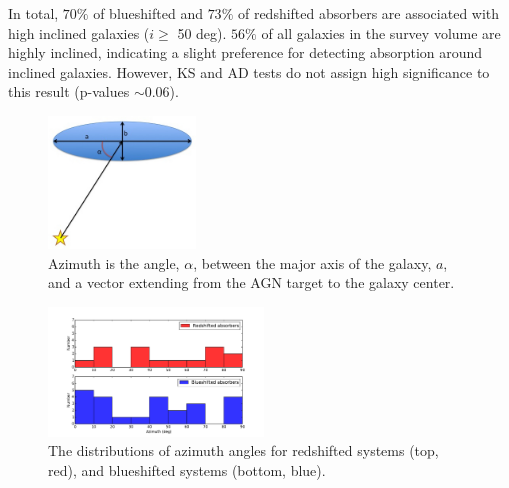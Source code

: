 \documentclass[iop]{emulateapj-rtx4}
\begin{document}
In total, $70\%$ of blueshifted and $73\%$ of redshifted absorbers are associated with high inclined galaxies ($i \geq$ 50 deg). $56\%$ of all galaxies in the survey volume are highly inclined, indicating a slight preference for detecting absorption around inclined galaxies. However, KS and AD tests do not assign high significance to this result (p-values $\sim0.06$).

\begin{figure}[h!]
        \centering
        \includegraphics[width=0.35\textwidth]{azimuth_illustration_cut.jpg}
        \caption{\small{Azimuth is the angle, $\alpha$, between the major axis of the galaxy, $a$, and a vector extending from the AGN target to the galaxy center.}}
        \label{azimuth_illustration}
\end{figure} 

\begin{figure}[h!]
        \centering
        \includegraphics[width=0.51\textwidth]{hist(azimuth)_dif_10.pdf}
        \caption{\small{The distributions of azimuth angles for redshifted systems (top, red), and blueshifted systems (bottom, blue).}}
        \label{azimuth_dist}
        \vspace{5pt}
\end{figure} 
\end{document}
